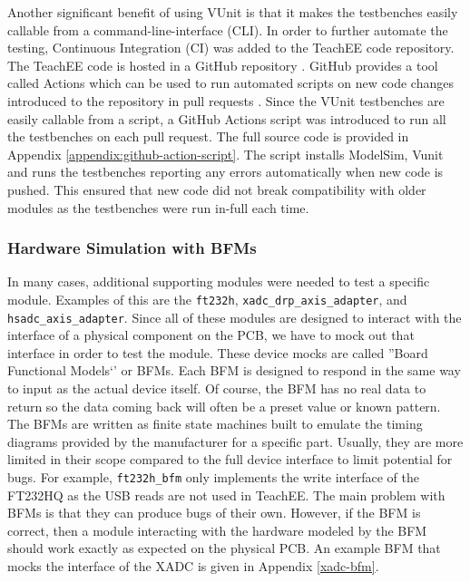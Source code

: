 \documentclass[letterpaper,11pt]{article}
\newcommand{\code}[1]{\texttt{#1}}
\begin{document}
Another significant benefit of using VUnit is that it makes the testbenches
easily callable from a command-line-interface (CLI). In order to further
automate the testing, Continuous Integration (CI) was added to the TeachEE code
repository. The TeachEE code is hosted in a GitHub repository
\cite{teachee-github}. GitHub provides a tool called Actions which can be used
to run automated scripts on new code changes introduced to the repository in
pull requests \cite{github-actions-doc}. Since the VUnit testbenches are easily
callable from a script, a GitHub Actions script was introduced to run all the
testbenches on each pull request. The full source code is provided in Appendix
\ref{appendix:github-action-script}. The script installs ModelSim, Vunit and
runs the testbenches reporting any errors automatically when new code is pushed.
This ensured that new code did not break compatibility with older modules as the
testbenches were run in-full each time.

\subsubsection{Hardware Simulation with BFMs}
In many cases, additional supporting modules were needed to test a specific
module. Examples of this are the \code{ft232h}, \code{xadc_drp_axis_adapter},
and \code{hsadc_axis_adapter}. Since all of these modules are designed to
interact with the interface of a physical component on the PCB, we have to mock
out that interface in order to test the module. These device mocks are called
''Board Functional Models`' or BFMs. Each BFM is designed to respond in the same
way to input as the actual device itself. Of course, the BFM has no real data to
return so the data coming back will often be a preset value or known pattern.
The BFMs are written as finite state machines built to emulate the timing
diagrams provided by the manufacturer for a specific part. Usually, they are
more limited in their scope compared to the full device interface to limit
potential for bugs. For example, \code{ft232h_bfm} only implements the write
interface of the FT232HQ as the USB reads are not used in TeachEE. The main
problem with BFMs is that they can produce bugs of their own. However, if the
BFM is correct, then a module interacting with the hardware modeled by the BFM
should work exactly as expected on the physical PCB. An example BFM that mocks
the interface of the XADC is given in Appendix \ref{xadc-bfm}.
\end{document}
